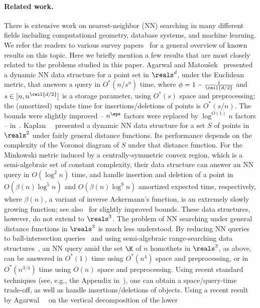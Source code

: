 \paragraph{Related work.}
\fi
There is extensive work on nearest-neighbor (NN) searching in many different fields including
computational geometry, database systems, and machine learning. We refer the readers to 
various survey papers~\cite{AE99,AI17,Cl} for a general overview of known results on this topic. 
Here we briefly mention a few results that are most closely related to the problems studied 
in this paper. Agarwal and Matou\v{s}ek~\cite{AM95} presented a dynamic NN data structure for 
a point set in $\reals^d$, under the Euclidean metric, that answers a query in $O^*(n/s^\phi)$ 
time, where $\phi=1-\tfrac{1}{\ceil{d/2}}$ and $s \in [n,n^{\ceil{d/2}}]$ is a storage parameter, 
using $O^*(s)$ space and preprocessing; the (amortized) update time for insertions/deletions of 
points is $O^*(s/n)$. The bounds were slightly improved -- $n^\eps$ factors were replaced by 
$\log^{O(1)}n$ factors -- in~\cite{Chan:le,KMRSS}.
Kaplan~\etal~\cite{KMRSS} presented a dynamic NN data structure for a set $S$ of points in 
$\reals^2$ under fairly general distance functions. Its performance depends on the 
complexity of the Voronoi diagram of $S$ under that distance function. For the Minkowski 
metric induced by a centrally-symmetric convex region, which is a semi-algebraic set of
constant complexity, their data structure can answer an NN query in $O(\log^2n)$ time, and handle 
insertion and deletion of a point in $O(\beta(n)\log^5n )$ and $O(\beta(n)\log^9n)$ 
amortized expected time, respectively, where $\beta(n)$, a variant of inverse Ackermann's function, is
an extremely slowly growing function; see also~\cite{Liu} for slightly improved bounds. 
These data structures, however, do not extend to $\reals^3$.
%
The problem of NN searching under general distance functions
in $\reals^3$ is much less understood.
By reducing NN queries to ball-intersection queries~\cite{AM93} and 
using semi-algebraic range-searching data structures~\cite{AAEZ,MP,AAEKS}, an NN query 
amid the set $\K$ of $n$ homothets in $\reals^3$, as above, can be answered in $O^*(1)$ time 
using $O^*(n^4)$ space and preprocessing, or in $O^*(n^{3/4})$ time using $O(n)$ space and preprocessing. 
Using recent standard techniques (see, e.g., the Appendix in~\cite{AAEKS}),
one can obtain a space/query-time trade-off, as well as handle insertions/deletions of objects.
Using a recent result by Agarwal~\etal~\cite{AES:vd} on the vertical decomposition of the lower 
